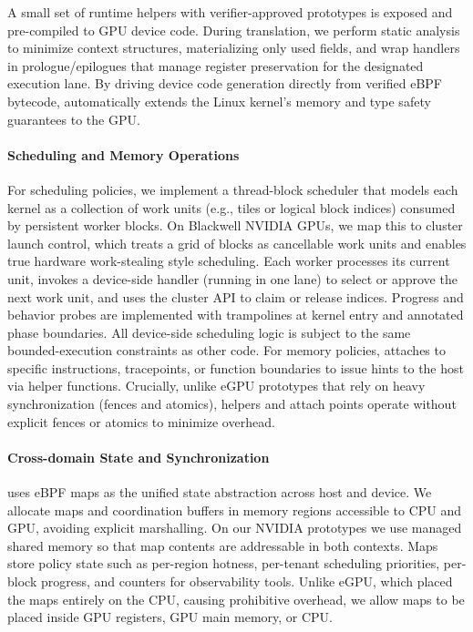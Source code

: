 A small set of runtime helpers with verifier-approved prototypes is exposed and pre-compiled to GPU device code. During translation, we perform static analysis to minimize context structures, materializing only used fields, and wrap handlers in prologue/epilogues that manage register preservation for the designated execution lane.
By driving device code generation directly from verified eBPF bytecode, \sys automatically extends the Linux kernel's memory and type safety guarantees to the GPU.


\paragraph{Scheduling and Memory Operations}

For scheduling policies, we implement a thread-block scheduler that models each
kernel as a collection of work units (e.g., tiles or logical block indices)
consumed by persistent worker blocks. On Blackwell NVIDIA GPUs, we map this to cluster
launch control\cite{}, which treats a grid of blocks as cancellable work units and enables true
hardware work-stealing style scheduling. Each worker processes its current unit, invokes a
device-side \sys handler (running in one lane) to select or approve the next work unit,
and uses the cluster API to claim or release indices. Progress and behavior probes are
implemented with \sys trampolines at kernel entry and annotated phase boundaries.
All device-side scheduling logic is subject to the same bounded-execution constraints as other \sys code. For memory policies, \sys attaches to specific instructions, tracepoints, or function boundaries to issue hints to the host via helper functions. Crucially, unlike eGPU prototypes that rely on heavy synchronization (fences and atomics), \sys helpers and attach points operate without explicit fences or atomics to minimize overhead.

\paragraph{Cross-domain State and Synchronization}

\sys uses eBPF maps as the unified state abstraction across host and device. We
allocate maps and coordination buffers in memory regions accessible to CPU and GPU,
avoiding explicit marshalling. On our NVIDIA prototypes we use managed shared
memory so that map contents are addressable in both contexts. Maps store policy
state such as per-region hotness, per-tenant scheduling priorities, per-block
progress, and counters for observability tools. Unlike eGPU, which placed the maps entirely on the CPU, causing prohibitive overhead, we allow maps to be placed inside GPU registers, GPU main memory, or CPU.
